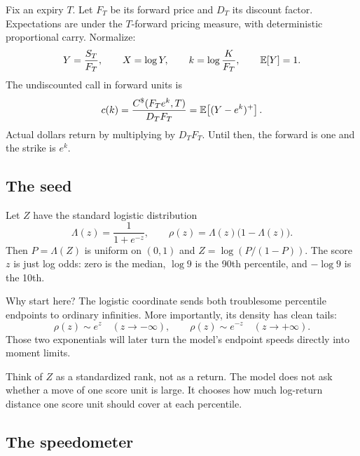 \documentclass[11pt]{article}
\begin{document}
Fix an expiry $T$.  Let $F_T$ be its forward price and $D_T$ its discount
factor.  Expectations are under the $T$-forward pricing measure, with
deterministic proportional carry.  Normalize:
\begin{equation}
Y=\frac{S_T}{F_T},\qquad X=\log Y,\qquad
k=\log\frac{K}{F_T},\qquad \mathbb{E}[Y]=1 .
\label{eq:normalization}
\end{equation}
The undiscounted call in forward units is
\begin{equation}
c(k)=\frac{C^\$(F_Te^k,T)}{D_TF_T}
    =\mathbb{E}\!\left[(Y-e^k)^+\right].
\label{eq:normalized_call}
\end{equation}
Actual dollars return by multiplying by $D_TF_T$.  Until then, the forward is
one and the strike is $e^k$.

\subsection{The seed}

Let $Z$ have the standard logistic distribution
\begin{equation}
\Lambda(z)=\frac{1}{1+e^{-z}},\qquad
\rho(z)=\Lambda(z)\bigl(1-\Lambda(z)\bigr).
\label{eq:logistic_seed}
\end{equation}
Then $P=\Lambda(Z)$ is uniform on $(0,1)$ and
$Z=\log(P/(1-P))$.  The score $z$ is just log odds: zero is the median,
$\log 9$ is the 90th percentile, and $-\log 9$ is the 10th.

Why start here?  The logistic coordinate sends both troublesome percentile
endpoints to ordinary infinities.  More importantly, its density has clean
tails:
\begin{equation}
\rho(z)\sim e^z\quad(z\to-\infty),\qquad
\rho(z)\sim e^{-z}\quad(z\to+\infty).
\label{eq:logistic_tails}
\end{equation}
Those two exponentials will later turn the model's endpoint speeds directly
into moment limits.

\begin{heuristic}
Think of $Z$ as a standardized rank, not as a return.  The model does not ask
whether a move of one score unit is large.  It chooses how much log-return
distance one score unit should cover at each percentile.
\end{heuristic}

\subsection{The speedometer}
\end{document}
